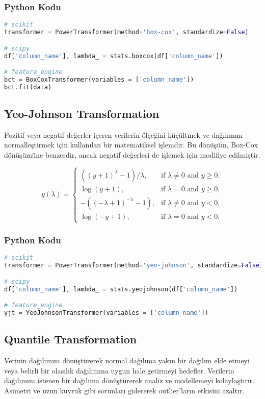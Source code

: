 \subsubsection{Python Kodu}

\begin{lstlisting}[language=Python]
# scikit
transformer = PowerTransformer(method='box-cox', standardize=False)

# scipy
df['column_name'], lambda_ = stats.boxcox(df['column_name'])

# feature_engine
bct = BoxCoxTransformer(variables = ['column_name'])
bct.fit(data)
\end{lstlisting}

\subsection{Yeo-Johnson Transformation}
Pozitif veya negatif değerler içeren verilerin ölçeğini küçültmek ve dağılımını normalleştirmek için kullanılan bir matematiksel işlemdir. Bu dönüşüm, Box-Cox dönüşümüne benzerdir, ancak negatif değerleri de işlemek için modifiye edilmiştir.

\[y(\lambda) = 
\begin{cases} 
((y + 1)^\lambda - 1) / \lambda, & \text{if } \lambda \neq 0 \text{ and } y \geq 0, \\ 
\log(y + 1), & \text{if } \lambda = 0 \text{ and } y \geq 0, \\ 
-((-\lambda + 1)^{-\lambda} - 1), & \text{if } \lambda \neq 0 \text{ and } y < 0, \\ 
\log(-y + 1), & \text{if } \lambda = 0 \text{ and } y < 0. 
\end{cases}\]

\subsubsection{Python Kodu}

\begin{lstlisting}[language=Python]
# scikit
transformer = PowerTransformer(method='yeo-johnson', standardize=False)

# scipy
df['column_name'], lambda_ = stats.yeojohnson(df['column_name'])

# feature_engine
yjt = YeoJohnsonTransformer(variables = ['column_name'])
\end{lstlisting}

\subsection{Quantile Transformation}
Verinin dağılımını dönüştürerek normal dağılıma yakın bir dağılım elde etmeyi veya belirli bir olasılık dağılımına uygun hale getirmeyi hedefler. Verilerin dağılımını istenen bir dağılıma dönüştürerek analiz ve modellemeyi kolaylaştırır. Asimetri ve uzun kuyruk gibi sorunları gidererek outlier'ların etkisini azaltır.

